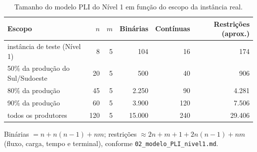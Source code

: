 \begin{table}[htbp]
\centering
\small
\caption{Tamanho do modelo PLI do Nível 1 em função do escopo da instância real.}
\label{tab:tamanho}
\begin{tabular}{lrrrrr}
\toprule
Escopo & $n$ & $m$ & Binárias & Contínuas & Restrições (aprox.) \\
\midrule
instância de teste (Nível 1) & 8 & 5 & 104 & 16 & 174 \\
50\% da produção do Sul/Sudoeste & 20 & 5 & 500 & 40 & 906 \\
80\% da produção & 45 & 5 & 2.250 & 90 & 4.281 \\
90\% da produção & 60 & 5 & 3.900 & 120 & 7.506 \\
todos os produtores & 120 & 5 & 15.000 & 240 & 29.406 \\
\bottomrule
\end{tabular}
\par\smallskip\footnotesize\raggedright Binárias $= n + n(n-1) + nm$; restrições $\approx 2n + m + 1 + 2n(n-1) + nm$ (fluxo, carga, tempo e terminal), conforme \texttt{02\_modelo\_PLI\_nivel1.md}.
\end{table}
